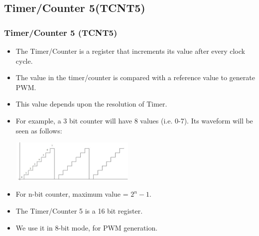 \documentclass[table,10pt,red]{beamer}	%
\begin{document}
\subsection{Timer/Counter 5(TCNT5)} 
\begin{frame}
	\frametitle{Timer/Counter 5 (TCNT5) }
	\begin{itemize}  %
		\item <+-|alert@+> The Timer/Counter is a register that increments its value after every clock cycle. 	
		\item <+-|alert@+> The value in the timer/counter is compared with a reference value to generate PWM.
		\item <+-|alert@+> This value depends upon the resolution of Timer.
		\item <+-|alert@+> For example, a 3 bit counter will have 8 values (i.e. 0-7). Its waveform will be seen as follows: 
		\pause
		\vfill
		\begin{center}
			\includegraphics[height=2cm, width=6cm]{PWM2}
		\end{center}
		\item <+-|alert@+> For n-bit counter, maximum value = $2^n - 1$.
		\item <+-|alert@+> The Timer/Counter 5 is a 16 bit register. 
		\item <+-|alert@+> We use it in 8-bit mode, for PWM generation.				
\end{itemize}
\end{frame}

\end{document}
